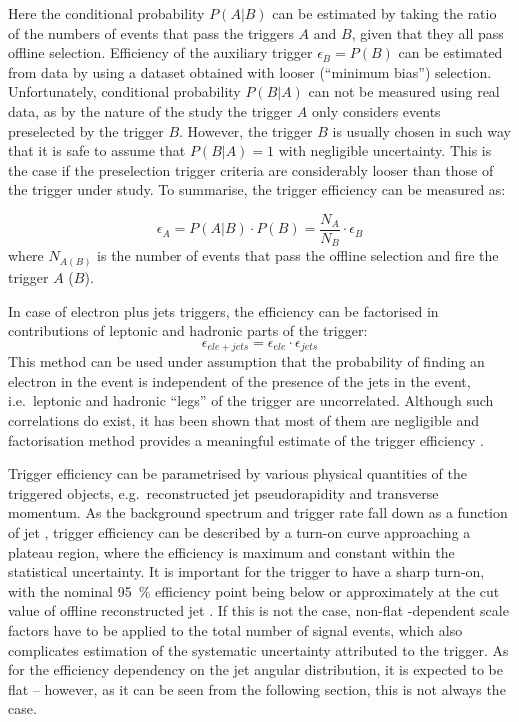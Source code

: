 Here the conditional probability $P(A|B)$ can be estimated by taking the ratio of the numbers of events that pass the
triggers $A$ and $B$, given that they all pass offline selection. Efficiency of the auxiliary trigger $\epsilon_{B} =
P(B)$ can be estimated from data by using a dataset obtained with looser (``minimum bias'') selection. Unfortunately,
conditional probability $P(B|A)$ can not be measured using real data, as by the nature of the study the trigger $A$ only
considers events preselected by the trigger $B$. However, the trigger $B$ is usually chosen in such way that it is safe
to assume that $P(B|A) = 1$ with negligible uncertainty. This is the case if the preselection trigger criteria are
considerably looser than those of the trigger under study. To summarise, the trigger efficiency can be measured as:

\begin{equation}
\epsilon_{A} = P(A|B) \cdot P(B) = \frac{N_A}{N_B} \cdot \epsilon_{B}
\end{equation}
where $N_{A (B)}$ is the number of events that pass the offline selection and fire the trigger $A$ ($B$).


In case of electron plus jets triggers, the efficiency can be factorised in contributions of leptonic and hadronic parts
of the trigger:
\begin{equation}
\epsilon_{ele+jets} = \epsilon_{ele} \cdot \epsilon_{jets}
\end{equation}
This method can be used under assumption that the probability of finding an electron in the event is independent of the
presence of the jets in the event, i.e.\ leptonic and hadronic ``legs'' of the trigger are uncorrelated. Although
such correlations do exist, it has been shown that most of them are negligible and factorisation method provides a
meaningful estimate of the trigger efficiency \cite{d0_note_top_trigger_efficiency}.

Trigger efficiency can be parametrised by various physical quantities of the triggered objects, e.g.\ reconstructed jet
pseudorapidity and transverse momentum. As the background spectrum and trigger rate fall down as a function of jet \pt,
trigger efficiency can be described by a turn-on curve approaching a plateau region, where the efficiency is maximum and
constant within the statistical uncertainty. It is important for the trigger to have a sharp turn-on, with the nominal
\SI{95}{\percent} efficiency point being below or approximately at the cut value of offline reconstructed jet \pt. If
this is not the case, non-flat \pt-dependent scale factors have to be applied to the total number of signal events,
which also complicates estimation of the systematic uncertainty attributed to the trigger. As for the efficiency
dependency on the jet angular distribution, it is expected to be flat -- however, as it can be seen from the following
section, this is not always the case.

